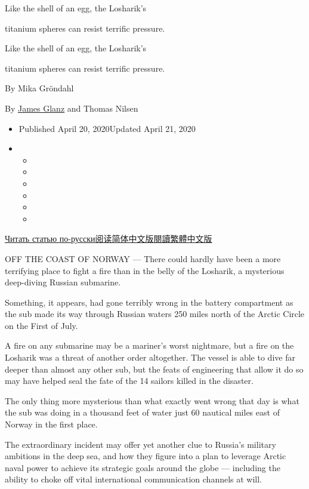 Like the shell of an egg, the Losharik's

titanium spheres can resist terrific pressure.

Like the shell of an egg, the Losharik's

titanium spheres can resist terrific pressure.

By Mika Gröndahl

By \href{https://www.nytimes.com/by/james-glanz}{James Glanz} and Thomas
Nilsen

\begin{itemize}
\item
  Published April 20, 2020Updated April 21, 2020
\item
  \begin{itemize}
  \item
  \item
  \item
  \item
  \item
  \item
  \end{itemize}
\end{itemize}

\href{https://www.nytimes.com/ru/2020/04/20/world/europe/russia-submarine-losharik-norway.html}{Читать
статью
по-русски}\href{https://cn.nytimes.com/world/20200421/russian-submarine-fire-losharik/}{阅读简体中文版}\href{https://cn.nytimes.com/world/20200421/russian-submarine-fire-losharik/zh-hant/}{閱讀繁體中文版}

OFF THE COAST OF NORWAY --- There could hardly have been a more
terrifying place to fight a fire than in the belly of the Losharik, a
mysterious deep-diving Russian submarine.

Something, it appears, had gone terribly wrong in the battery
compartment as the sub made its way through Russian waters 250 miles
north of the Arctic Circle on the First of July.

A fire on any submarine may be a mariner's worst nightmare, but a fire
on the Losharik was a threat of another order altogether. The vessel is
able to dive far deeper than almost any other sub, but the feats of
engineering that allow it do so may have helped seal the fate of the 14
sailors killed in the disaster.

The only thing more mysterious than what exactly went wrong that day is
what the sub was doing in a thousand feet of water just 60 nautical
miles east of Norway in the first place.

The extraordinary incident may offer yet another clue to Russia's
military ambitions in the deep sea, and how they figure into a plan to
leverage Arctic naval power to achieve its strategic goals around the
globe --- including the ability to choke off vital international
communication channels at will.

